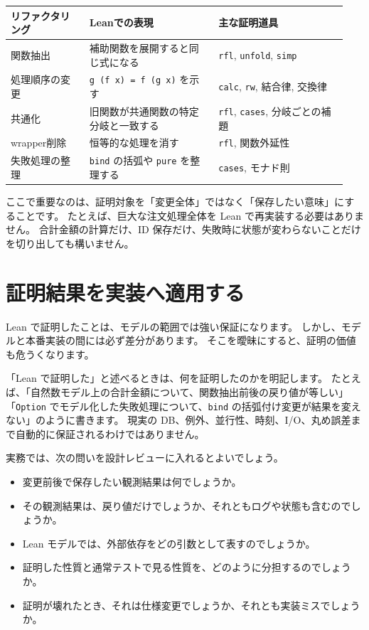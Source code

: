 \small
\setlength{\tabcolsep}{3pt}
\begin{longtable}{@{}p{0.22\linewidth}p{0.36\linewidth}p{0.36\linewidth}@{}}
\toprule
リファクタリング & Leanでの表現 & 主な証明道具 \\
\midrule
関数抽出 & 補助関数を展開すると同じ式になる & \texttt{rfl}, \texttt{unfold}, \texttt{simp} \\
処理順序の変更 & \texttt{g (f x) = f (g x)} を示す & \texttt{calc}, \texttt{rw}, 結合律, 交換律 \\
共通化 & 旧関数が共通関数の特定分岐と一致する & \texttt{rfl}, \texttt{cases}, 分岐ごとの補題 \\
wrapper削除 & 恒等的な処理を消す & \texttt{rfl}, 関数外延性 \\
失敗処理の整理 & \texttt{bind} の括弧や \texttt{pure} を整理する & \texttt{cases}, モナド則 \\
\bottomrule
\end{longtable}

ここで重要なのは、証明対象を「変更全体」ではなく「保存したい意味」にすることです。
たとえば、巨大な注文処理全体を Lean で再実装する必要はありません。
合計金額の計算だけ、ID 保存だけ、失敗時に状態が変わらないことだけを切り出しても構いません。

\section{証明結果を実装へ適用する}

Lean で証明したことは、モデルの範囲では強い保証になります。
しかし、モデルと本番実装の間には必ず差分があります。
そこを曖昧にすると、証明の価値も危うくなります。

「Lean で証明した」と述べるときは、何を証明したのかを明記します。
たとえば、「自然数モデル上の合計金額について、関数抽出前後の戻り値が等しい」「\texttt{Option} でモデル化した失敗処理について、\texttt{bind} の括弧付け変更が結果を変えない」のように書きます。
現実の DB、例外、並行性、時刻、I/O、丸め誤差まで自動的に保証されるわけではありません。

実務では、次の問いを設計レビューに入れるとよいでしょう。

\begin{itemize}
\item 変更前後で保存したい観測結果は何でしょうか。
\item その観測結果は、戻り値だけでしょうか、それともログや状態も含むのでしょうか。
\item Lean モデルでは、外部依存をどの引数として表すのでしょうか。
\item 証明した性質と通常テストで見る性質を、どのように分担するのでしょうか。
\item 証明が壊れたとき、それは仕様変更でしょうか、それとも実装ミスでしょうか。
\end{itemize}

